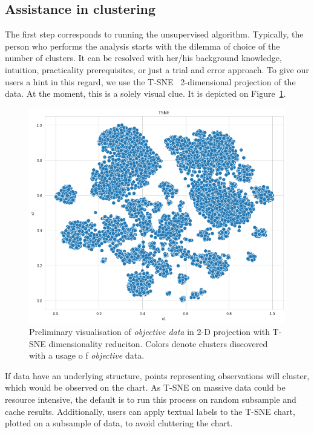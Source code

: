 \documentclass[
 twocolumn,
 hf,
]{ceurart}
\begin{document}
\subsection{Assistance in clustering}\label{subsec:assistance-in-clustering}
The first step corresponds to running the unsupervised algorithm.
Typically, the person who performs the analysis starts with the dilemma of choice of the number of clusters.
It can be resolved with her/his background knowledge, intuition, practicality prerequisites, or just a trial and error approach. %
To give our users a hint in this regard, we use the T-SNE~\cite{tsne} 2-dimensional projection of the data.
At the moment, this is a solely visual clue.
It is depicted on Figure~\ref{fig:tsne}.
\begin{figure}[h!]
  \centering
  \includegraphics[width=\linewidth]{example1-clustering-products-fashion-tex/output_57_1}
  \caption{Preliminary visualisation of \textit{objective data} in 2-D projection with T-SNE dimensionality reduciton. Colors denote clusters discovered with a usage o f \textit{objective} data.} 
  \label{fig:tsne}
\end{figure}
If data have an underlying structure, points representing observations will cluster, which would be observed on the chart.
As T-SNE on massive data could be resource intensive, the default is to run this process on random subsample and cache results.
Additionally, users can apply textual labels to the T-SNE chart, plotted on a subsample of data, to avoid cluttering the chart. %
\end{document}
